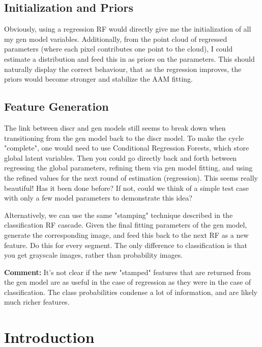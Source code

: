 \subsection{Initialization and Priors}

Obviously, using a regression RF would directly give me the initialization of all my gen model variables.  Additionally, from the point cloud of regressed parameters (where each pixel contributes one point to the cloud), I could estimate a distribution and feed this in as priors on the parameters.  This should naturally display the correct behaviour, that as the regression improves, the priors would become stronger and stabilize the AAM fitting.

\subsection{Feature Generation}

The link between discr and gen models still seems to break down when transitioning from the gen model back to the discr model.  To make the cycle "complete", one would need to use Conditional Regression Forests, which store global latent variables. Then you could go directly back and forth between regressing the global parameters, refining them via gen model fitting, and using the refined values for the next round of estimation (regression).  This seems really beautiful!  Has it been done before?  If not, could we think of a simple test case with only a few model parameters to demonstrate this idea?

Alternatively, we can use the same "stamping" technique described in the classification RF cascade.  Given the final fitting parameters of the gen model, generate the corresponding image, and feed this back to the next RF as a new feature.  Do this for every segment.  The only difference to classification is that you get grayscale images, rather than probability images.

\textbf{Comment:} It's not clear if the new "stamped" features that are returned from the gen model are as useful in the case of regression as they were in the case of classification.  The class probabilities condense a lot of information, and are likely much richer features.









\section{Introduction}

